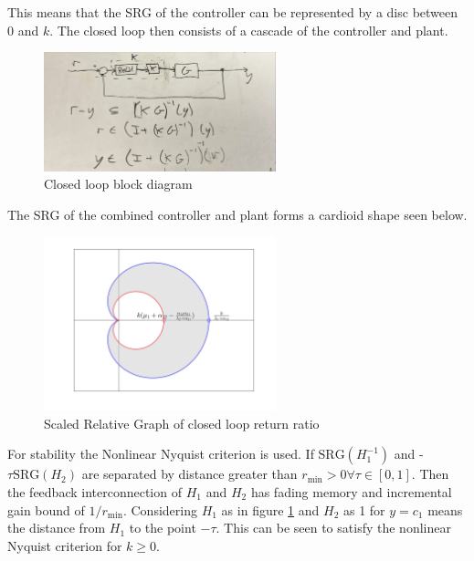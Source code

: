 \documentclass{article}
\begin{document}
This means that the SRG of the controller can be represented by a disc between 0 and $k$.
The closed loop then consists of a cascade of the controller and plant.

\begin{figure}[H]
    \centering
    \includegraphics[width=0.6\textwidth]{figures/closed_loop.jpg}
    \caption{Closed loop block diagram}
\end{figure}
The SRG of the combined controller and plant forms a cardioid shape seen below.

\begin{figure}[H]
    \centering
    \includegraphics[width=0.6\textwidth]{figures/closed_loop_return_ratio.png}
    \caption{Scaled Relative Graph of closed loop return ratio}
    \label{fig:return_ratio_srg}
\end{figure}

For stability the Nonlinear Nyquist criterion is used.
If $\text{SRG}(H_1^{-1})$ and -$\tau \text{SRG}(H_2)$ are separated by distance greater than $r_\text{min} > 0 \forall \tau \in [0,1]$.
Then the feedback interconnection of $H_1$ and $H_2$ has fading memory and incremental gain bound of $1/r_\text{min}$.
Considering $H_1$ as in figure \ref{fig:return_ratio_srg} and $H_2$ as 1 for $y=c_1$ means the distance from $H_1$ to the point $-\tau$.
This can be seen to satisfy the nonlinear Nyquist criterion for $k \geq 0$.
\end{document}
